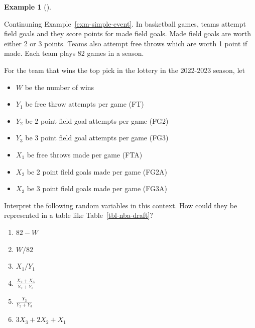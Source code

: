 \documentclass[
  letterpaper,
  DIV=11,
  numbers=noendperiod]{scrreprt}
\providecommand{\tightlist}{%
  \setlength{\itemsep}{0pt}\setlength{\parskip}{0pt}}
\theoremstyle{plain}
\theoremstyle{definition}
\newtheorem{example}{Example}[chapter]
\theoremstyle{definition}
\theoremstyle{definition}
\theoremstyle{remark}
\begin{document}
\begin{tcolorbox}[enhanced jigsaw, opacityback=0, left=2mm, colframe=quarto-callout-note-color-frame, toprule=.15mm, breakable, colback=white, leftrule=.75mm, arc=.35mm, rightrule=.15mm, bottomrule=.15mm]

\begin{example}[]\protect\hypertarget{exm-rv-transform-simple}{}\label{exm-rv-transform-simple}

Continuning Example~\ref{exm-simple-event}. In basketball games, teams
attempt field goals and they score points for made field goals. Made
field goals are worth either 2 or 3 points. Teams also attempt free
throws which are worth 1 point if made. Each team plays 82 games in a
season.

For the team that wins the top pick in the lottery in the 2022-2023
season, let

\begin{itemize}
\tightlist
\item
  \(W\) be the number of wins
\item
  \(Y_1\) be free throw attempts per game (FT)
\item
  \(Y_2\) be 2 point field goal attempts per game (FG2)
\item
  \(Y_3\) be 3 point field goal attempts per game (FG3)
\item
  \(X_1\) be free throws made per game (FTA)
\item
  \(X_2\) be 2 point field goals made per game (FG2A)
\item
  \(X_3\) be 3 point field goals made per game (FG3A)
\end{itemize}

Interpret the following random variables in this context. How could they
be represented in a table like Table~\ref{tbl-nba-draft}?

\begin{enumerate}
\def\labelenumi{\arabic{enumi}.}
\tightlist
\item
  \(82 - W\)
\item
  \(W / 82\)
\item
  \(X_1 / Y_1\)
\item
  \(\frac{X_2 + X_3}{Y_2+Y_3}\)
\item
  \(\frac{Y_3}{Y_2+Y_3}\)
\item
  \(3X_3 + 2X_2 + X_1\)
\end{enumerate}

\end{example}

\end{tcolorbox}
\end{document}
